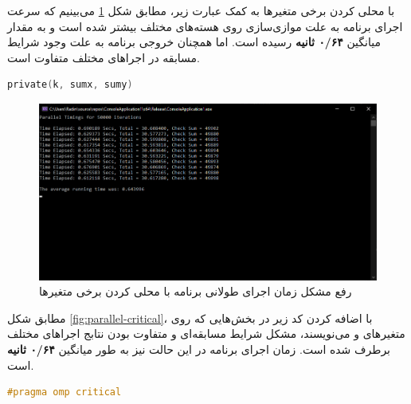 \documentclass{HW}
\begin{document}
با محلی کردن برخی متغیرها به کمک عبارت زیر، مطابق شکل
\ref{fig:parallel-private}
می‌بینیم که سرعت اجرای برنامه به علت موازی‌سازی روی هسته‌های مختلف بیشتر شده است و به مقدار میانگین \textbf{۰/۶۴ ثانیه} رسیده است. اما همچنان خروجی برنامه به علت وجود شرایط مسابقه در اجراهای مختلف متفاوت است.

\begin{latin}
\begin{lstlisting}[language=C]
private(k, sumx, sumy)
\end{lstlisting}
\end{latin}

\begin{figure}[ht!]
\begin{center}
	\includegraphics[width=15cm]{images/parallel-private}
\end{center}
\caption{رفع مشکل زمان اجرای طولانی برنامه با محلی کردن برخی متغیرها}
\label{fig:parallel-private}
\end{figure}

مطابق شکل
\ref{fig:parallel-critical}،
با اضافه کردن کد زیر در بخش‌هایی که روی متغیرهای  و  می‌نویسند، مشکل شرایط مسابقه‌ای و متفاوت بودن نتابج اجراهای مختلف برطرف شده است.  زمان اجرای برنامه در این حالت نیز به طور میانگین \textbf{۰/۶۴ ثانیه} است.

\begin{latin}
\begin{lstlisting}[language=C]
#pragma omp critical
\end{lstlisting}
\end{latin}
\end{document}
